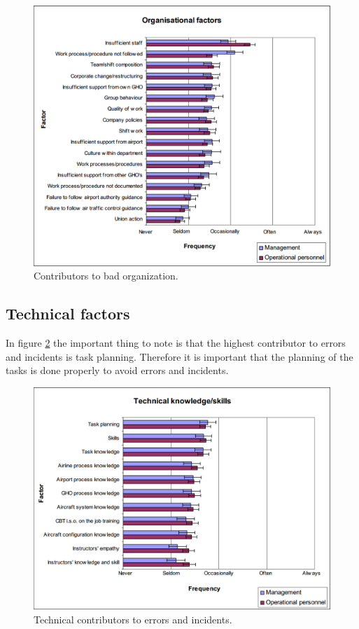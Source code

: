\begin{figure}[H]
\centering
\includegraphics[width=\textwidth]{Grafik/OrganisationalFactors}
\caption{Contributors to bad organization.}
\label{OrganisationalFactors}
\end{figure}

\newpage
\subsection{Technical factors}
In figure \ref{TechnicalFactors} the important thing to note is that the highest contributor to errors and incidents is task planning. Therefore it is important that the planning of the tasks is done properly to avoid errors and incidents.

\begin{figure}[H]
\centering
\includegraphics[width=\textwidth]{Grafik/TechnicalFactors}
\caption{Technical contributors to errors and incidents.}
\label{TechnicalFactors}
\end{figure}

